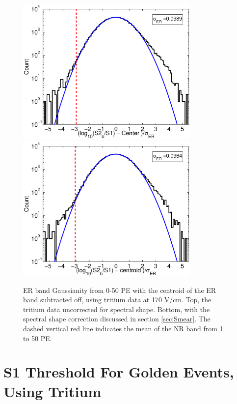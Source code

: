 \renewcommand{\baselinestretch}{1}
\small\normalsize
\begin{figure}[h!]\centering
\includegraphics[width=90mm]{Chapter_T/Figures/ER_Band/GaussER_rawSpec.eps}
\includegraphics[width=90mm]{Chapter_T/Figures/ER_Band/GaussER.eps}
\caption{ER band Gaussianity from 0-50 PE with the centroid of the ER band subtracted off, using tritium data at 170 V/cm. Top, the tritium data uncorrected for spectral shape. Bottom, with the spectral shape correction discussed in section \ref{sec:Smear}. The dashed vertical red line indicates the mean of the NR band from 1 to 50 PE.}
\label{fig:Gaussianity}
\end{figure}
\renewcommand{\baselinestretch}{2}
\small\normalsize

\newpage



\section{S1 Threshold For Golden Events, Using Tritium}

